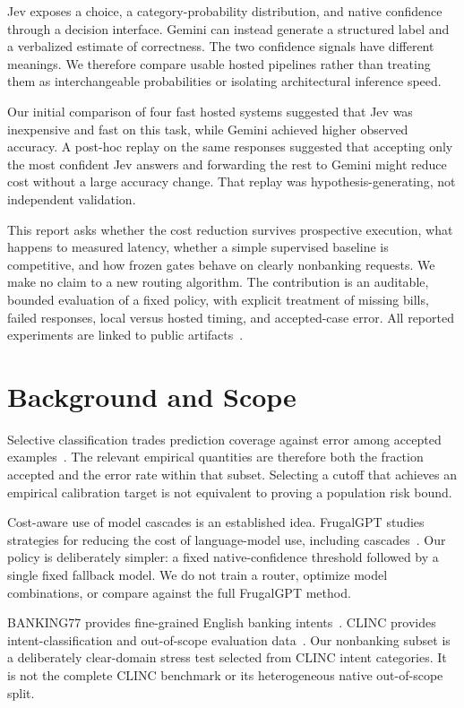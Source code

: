 \documentclass[conference]{IEEEtran}
\begin{document}
Jev exposes a choice, a category-probability distribution, and native confidence through a decision interface. Gemini can instead generate a structured label and a verbalized estimate of correctness. The two confidence signals have different meanings. We therefore compare usable hosted pipelines rather than treating them as interchangeable probabilities or isolating architectural inference speed.

Our initial comparison of four fast hosted systems suggested that Jev was inexpensive and fast on this task, while Gemini achieved higher observed accuracy. A post-hoc replay on the same responses suggested that accepting only the most confident Jev answers and forwarding the rest to Gemini might reduce cost without a large accuracy change. That replay was hypothesis-generating, not independent validation.

This report asks whether the cost reduction survives prospective execution, what happens to measured latency, whether a simple supervised baseline is competitive, and how frozen gates behave on clearly nonbanking requests. We make no claim to a new routing algorithm. The contribution is an auditable, bounded evaluation of a fixed policy, with explicit treatment of missing bills, failed responses, local versus hosted timing, and accepted-case error. All reported experiments are linked to public artifacts~\cite{artifacts}.

\section{Background and Scope}
Selective classification trades prediction coverage against error among accepted examples~\cite{selective}. The relevant empirical quantities are therefore both the fraction accepted and the error rate within that subset. Selecting a cutoff that achieves an empirical calibration target is not equivalent to proving a population risk bound.

Cost-aware use of model cascades is an established idea. FrugalGPT studies strategies for reducing the cost of language-model use, including cascades~\cite{frugalgpt}. Our policy is deliberately simpler: a fixed native-confidence threshold followed by a single fixed fallback model. We do not train a router, optimize model combinations, or compare against the full FrugalGPT method.

BANKING77 provides fine-grained English banking intents~\cite{banking}. CLINC provides intent-classification and out-of-scope evaluation data~\cite{clinc}. Our nonbanking subset is a deliberately clear-domain stress test selected from CLINC intent categories. It is not the complete CLINC benchmark or its heterogeneous native out-of-scope split.
\end{document}
